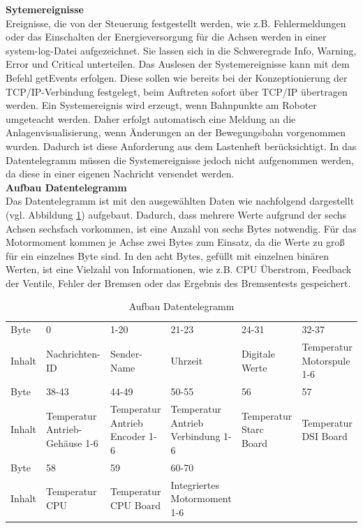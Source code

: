 \documentclass[ a4paper,
                oneside,
                toc=bibliography,
                toc=listof
                ]{scrbook}
\begin{document}
 	\clearpage
 	\noindent
	\textbf{Sytemereignisse}\\
	Ereignisse, die von der Steuerung festgestellt werden, wie z.B. Fehlermeldungen oder das Einschalten der Energieversorgung für die Achsen werden in einer system-log-Datei aufgezeichnet. Sie lassen sich in die Schweregrade \glqq Info\grqq{}, \glqq Warning\grqq{}, \glqq Error\grqq{} und \glqq Critical\grqq{} unterteilen. Das Auslesen der Systemereignisse kann mit dem Befehl \glqq getEvents\grqq{} erfolgen. Diese sollen wie bereits bei der Konzeptionierung der TCP/IP-Verbindung festgelegt, beim Auftreten sofort über TCP/IP übertragen werden. Ein Systemereignis wird erzeugt, wenn Bahnpunkte am Roboter \glqq umgeteacht\grqq{} werden. Daher erfolgt automatisch eine Meldung an die Anlagenvisualisierung, wenn Änderungen an der Bewegungsbahn vorgenommen wurden. Dadurch ist diese Anforderung aus dem Lastenheft berücksichtigt. In das Datentelegramm müssen die Systemereignisse jedoch nicht aufgenommen werden, da diese in einer eigenen Nachricht versendet werden.\vspace{0.5\baselineskip}\\
	\textbf{Aufbau Datentelegramm}\\
	Das Datentelegramm ist mit den ausgewählten Daten wie nachfolgend dargestellt (vgl. Abbildung \ref{tab:Datentelegramm}) aufgebaut. Dadurch, dass mehrere Werte aufgrund der sechs Achsen sechsfach vorkommen, ist eine Anzahl von sechs Bytes notwendig. Für das Motormoment kommen je Achse zwei Bytes zum Einsatz, da die Werte zu groß für ein einzelnes Byte sind. In den acht Bytes, gefüllt mit einzelnen binären Werten, ist eine Vielzahl von Informationen, wie z.B. CPU Überstrom, Feedback der Ventile, Fehler der Bremsen oder das Ergebnis des Bremsentests gespeichert.
	\begin{table}[!h]
		\centering
		\caption{Aufbau Datentelegramm}
		\label{tab:Datentelegramm}
		\begin{tabular}{p{1cm}p{2.2cm}p{2.2cm}p{2.2cm}p{2.2cm}p{2.2cm}}
			\hline
			\cellcolor{gray!20} Byte& 0 & 1-20 & 21-23 & 24-31 & 32-37  \\
			\cellcolor{gray!20} Inhalt & Nachrichten-ID & Sender-Name & Uhrzeit & Digitale Werte & Temperatur Motorspule 1-6\\
			\hline
			\cellcolor{gray!20} Byte& 38-43 & 44-49 & 50-55 & 56 & 57  \\
			\cellcolor{gray!20} Inhalt & Temperatur Antrieb-Gehäuse 1-6 & Temperatur Antrieb Encoder 1-6 & Temperatur Antrieb Verbindung 1-6& Temperatur Starc Board & Temperatur DSI Board\\
			\hline
			\cellcolor{gray!20} Byte& 58 & 59 & 60-70 &  &   \\
			\cellcolor{gray!20} Inhalt & Temperatur CPU & Temperatur CPU Board & Integriertes Motormoment 1-6&  & \\
			\hline
		\end{tabular}
	\end{table}
	
\end{document}
